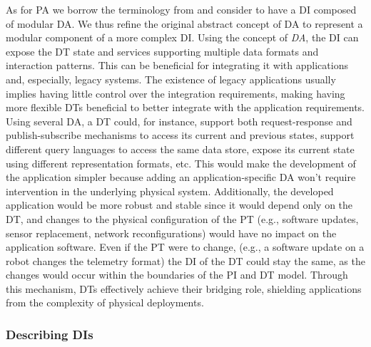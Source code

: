 As for \ac{PA} we borrow the terminology from \cite{web-of-dt-ricci-2022} and consider to have a \ac{DI} composed of modular \ac{DA}.
We thus refine the original abstract concept of \ac{DA} to represent a modular component of a more complex \ac{DI}.
Using the concept of \emph{\ac{DA}}, the \ac{DI} can expose the \ac{DT} state and services supporting multiple data formats and interaction patterns.
This can be beneficial for integrating it with applications and, especially, legacy systems.
The existence of legacy applications usually implies having little control over the integration requirements, making having more flexible \acp{DT} beneficial to better integrate with the application requirements.
%
Using several \ac{DA}, a \ac{DT} could, for instance, support both request-response and publish-subscribe mechanisms to access its current and previous states, support different query languages to access the same data store, expose its current state using different representation formats, etc.
%
This would make the development of the application simpler because adding an application-specific \ac{DA} won't require intervention in the underlying physical system. 
%
Additionally, the developed application would be more robust and stable since it would depend only on the \ac{DT}, and changes to the physical configuration of the \ac{PT} (e.g., software updates, sensor replacement, network reconfigurations) would have no impact on the application software.
%
Even if the \ac{PT} were to change, (e.g., a software update on a robot changes the telemetry format) the \ac{DI} of the \ac{DT} could stay the same, as the changes would occur within the boundaries of the \ac{PI} and \ac{DT} model.
%
Through this mechanism, \acp{DT} effectively achieve their bridging role, shielding applications from the complexity of physical deployments.

\subsubsection{Describing \aclp{DI}}

